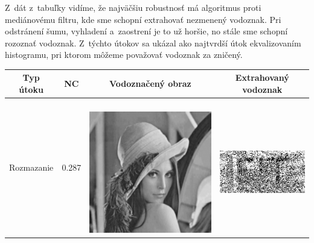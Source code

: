 Z~dát z~tabuľky vidíme, že najväčšiu robustnosť má algoritmus proti mediánovému filtru, kde sme schopní extrahovať nezmenený vodoznak. Pri odstránení šumu, vyhladení a~zaostrení je to už horšie, no stále sme schopní rozoznať vodoznak. Z~týchto útokov sa ukázal ako najtvrdší útok ekvalizovaním histogramu, pri ktorom môžeme považovať vodoznak za zničený.
\begin{table}[h]
\centering
\label{enhance-table}
\begin{tabular}{llcc}
\hline
\multicolumn{1}{c}{\textbf{Typ útoku}} & \multicolumn{1}{c}{\textbf{NC}} & \multicolumn{1}{c}{\textbf{Vodoznačený obraz}} & \multicolumn{1}{c}{\textbf{Extrahovaný vodoznak}} \\ \hline
Rozmazanie                             & 0.287 &
\begin{minipage}[c]{.1\textwidth}
\ 
  \includegraphics[scale=0.1]{obrazky/blur}
\end{minipage} &
\begin{minipage}[c]{.15\textwidth}
\ 
  \includegraphics[scale=0.25]{obrazky/blur-wm}

\end{minipage}
\end{tabular}
\end{table}
